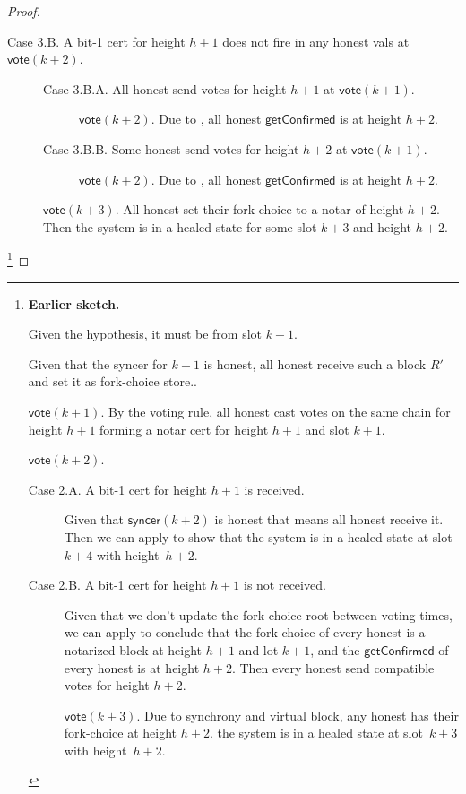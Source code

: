 \ifx\litemode\undefined\documentclass{article}\fi
\newcommand{\syncer}{\mathsf{syncer}}
\newcommand{\vote}{\mathsf{vote}}
\newcommand{\getConfirmed}{\textsf{getConfirmed}\xspace}
\theoremstyle{plain}
\theoremstyle{definition}
\theoremstyle{remark}
\begin{document}
\begin{proof}
{\begin{description}
\begin{description}
    \item[Case 3.B. A bit-1 cert for height $h+1$ does not fire in any honest vals at $\vote(k+2)$.]\hfill

    
    \begin{description}
      \item[Case 3.B.A. All honest send votes for height $h+1$ at $\vote(k+1)$.]\hfill  
      $\vote(k+2)$. Due to , all honest $\getConfirmed$ is at height $h+2$.

      \item[Case 3.B.B. Some honest send votes for height $h+2$ at $\vote(k+1)$.]\hfill  
      $\vote(k+2)$. Due to , all honest $\getConfirmed$ is at height $h+2$.
    \end{description}
    
    $\vote(k+3)$. All honest set their fork-choice to a notar of height $h+2$.
    Then the system is in a healed state for some slot $k+3$ and height $h+2$.
  \end{description}
\end{description}}\footnote{\textbf{Earlier sketch.} \item[Case 2. A notarized block $R'$ for height $h+1$ and conflicting with $R_v^{\vote(k)}$ is received by an honest at time $\vote(k+1)$.] Given the hypothesis, it must be from slot $k-1$.
  

  Given that the syncer for $k+1$ is honest, all honest receive such a block $R'$ and set it as fork-choice store..

  $\vote(k+1)$. By the voting rule, all honest cast votes on the same chain for height $h+1$ forming a notar cert for height $h+1$ and slot $k+1$.

  $\vote(k+2)$. 
  \begin{description}
    \item[Case 2.A. A bit-1 cert for height $h+1$ is received.]
  Given that $\syncer(k+2)$ is honest that means all honest receive it.
  Then we can apply   to show that the system is in a healed state at slot~$k+4$ with height~$h+2$.

    \item[Case 2.B. A bit-1 cert for height $h+1$ is not received.]
    Given that we don't update the fork-choice root between voting times, we can apply  to conclude that the fork-choice of every honest is a notarized block at height $h+1$ and lot $k+1$, and the $\getConfirmed$ of every honest is at height $h+2$.
    Then every honest send compatible votes for height $h+2$.

    $\vote(k+3)$. Due to synchrony and virtual block, any honest has their fork-choice at height $h+2$.  
    the system is in a healed state at slot~$k+3$ with height~$h+2$.
  \end{description}}

\end{proof}
\end{document}
